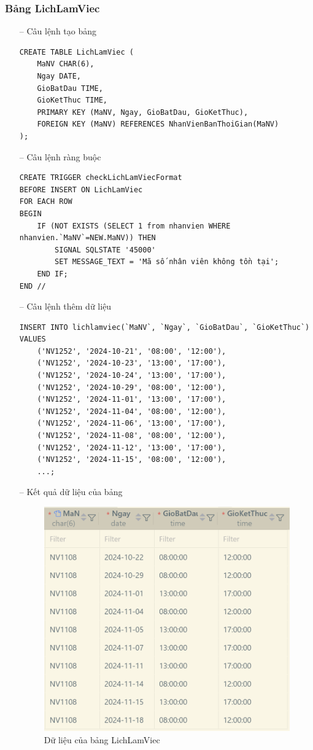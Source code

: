 \subsubsection{Bảng LichLamViec}
\begin{itemize}
    \item [--] Câu lệnh tạo bảng
   \begin{verbatim}
CREATE TABLE LichLamViec (
    MaNV CHAR(6),
    Ngay DATE,
    GioBatDau TIME,
    GioKetThuc TIME,
    PRIMARY KEY (MaNV, Ngay, GioBatDau, GioKetThuc),
    FOREIGN KEY (MaNV) REFERENCES NhanVienBanThoiGian(MaNV)
);
    \end{verbatim}
    \item [--] Câu lệnh ràng buộc
   \begin{verbatim}
CREATE TRIGGER checkLichLamViecFormat 
BEFORE INSERT ON LichLamViec
FOR EACH ROW
BEGIN
    IF (NOT EXISTS (SELECT 1 from nhanvien WHERE nhanvien.`MaNV`=NEW.MaNV)) THEN
        SIGNAL SQLSTATE '45000'
        SET MESSAGE_TEXT = 'Mã số nhân viên không tồn tại';
    END IF;
END //
    \end{verbatim}
    \newpage
    \item [--] Câu lệnh thêm dữ liệu
   \begin{verbatim}
INSERT INTO lichlamviec(`MaNV`, `Ngay`, `GioBatDau`, `GioKetThuc`)
VALUES
    ('NV1252', '2024-10-21', '08:00', '12:00'),
    ('NV1252', '2024-10-23', '13:00', '17:00'),
    ('NV1252', '2024-10-24', '13:00', '17:00'),
    ('NV1252', '2024-10-29', '08:00', '12:00'),
    ('NV1252', '2024-11-01', '13:00', '17:00'),
    ('NV1252', '2024-11-04', '08:00', '12:00'),
    ('NV1252', '2024-11-06', '13:00', '17:00'),
    ('NV1252', '2024-11-08', '08:00', '12:00'),
    ('NV1252', '2024-11-12', '13:00', '17:00'),
    ('NV1252', '2024-11-15', '08:00', '12:00'),
    ...;
    \end{verbatim}
    \item [--] Kết quả dữ liệu của bảng
    \begin{figure}[H]
        \centering
        \includegraphics[width=0.9\linewidth]{content/images/data_lichlamviec.png}
        \caption{Dữ liệu của bảng LichLamViec}
        \label{fig:data_lichlamviec}
    \end{figure}
\end{itemize}
\newpage
